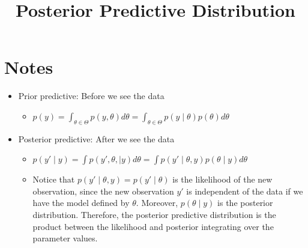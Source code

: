\documentclass[10pt,a4paper]{article}
\title{Posterior Predictive Distribution}
\begin{document}
\maketitle 

\section{Notes}
\begin{itemize}
\item Prior predictive: Before we see the data
	\begin{itemize}
	\item $p(y) = \int_{\theta \in \Theta} p(y,\theta)d\theta = \int_{\theta \in \Theta} p(y \mid \theta)p(\theta)d\theta$
	\end{itemize}
\item Posterior predictive: After we see the data
	\begin{itemize}
	\item $p(y'\mid y)=\int p(y',\theta,\mid y)d\theta = \int p(y' \mid \theta,y)p(\theta \mid y)d\theta$
	\item Notice that $p(y' \mid \theta, y) = p(y' \mid \theta)$ is the likelihood of the new observation, since the new observation $y'$ is independent of the data if we have the model defined by $\theta$. Moreover, $p(\theta \mid y)$ is the posterior distribution. Therefore, the posterior predictive distribution is the product between the likelihood and posterior integrating over the parameter values.
	\end{itemize}
\end{itemize}
\end{document}
